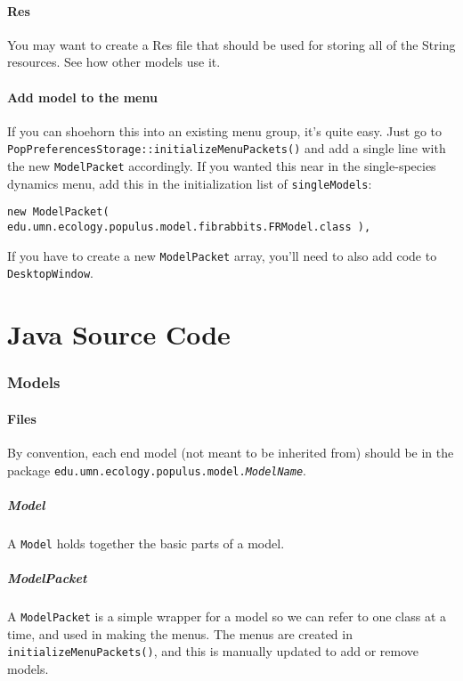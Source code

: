 \documentclass[12pt]{article}
\begin{document}
\subsection{Res}
You may want to create a Res file that should be used for storing all of the String resources.  See how other models use it.

\subsection{Add model to the menu}
If you can shoehorn this into an existing menu group, it's quite easy.  Just go to \texttt{PopPreferencesStorage::initializeMenuPackets()} and add a single line with the new \texttt{ModelPacket} accordingly.  If you wanted this near in the single-species dynamics menu, add this in the initialization list of \texttt{singleModels}:

\begin{verbatim}
new ModelPacket( edu.umn.ecology.populus.model.fibrabbits.FRModel.class ),
\end{verbatim}

If you have to create a new \texttt{ModelPacket} array, you'll need to also add code to \texttt{DesktopWindow}.

\part{Java Source Code}

\section{Models}

\subsection{Files}
By convention, each end model (not meant to be inherited from) should be in the package \texttt{edu.umn.ecology.populus.model.\textit{ModelName}}.

\subsubsection{Model}
A \texttt{Model} holds together the basic parts of a model.

\subsubsection{ModelPacket}
A \texttt{ModelPacket}  is a simple wrapper for a model so we can refer to one class at a time, and used in making the menus.  The menus are created in \texttt{initializeMenuPackets()}, and this is manually updated to add or remove models.
\end{document}

